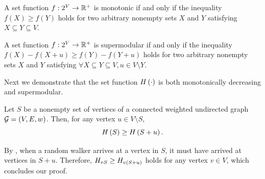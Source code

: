 \documentclass[10pt,twocolumn,twoside]{IEEEtran}
\begin{document}
\begin{definition}[Monotonicity]
    A set function \(f:2^{V}\to\mathbb{R}^+\) is monotonic if and only if the inequality \(f(X)\ge f(Y)\) holds for two arbitrary  nonempty sets \(X\) and \(Y\)  satisfying \(X\subseteq Y\subseteq V\).
\end{definition}

\begin{definition}[Supermodularity]
    A set function \(f:2^{V}\to\mathbb{R}^+\) is  supermodular if and only if the inequality \(f(X)-f(X+u)\ge f(Y)-f(Y+u)\) holds for two arbitrary nonempty sets \(X\) and \(Y\) satisfying \(\forall X\subseteq Y\subseteq V, u\in V\setminus Y\).
\end{definition}

Next we demonstrate that the set function \(H\left(\cdot\right)\) is both monotonically decreasing and supermodular.

\begin{theorem}\label{thm:mono}
    Let \(S\) be a nonempty set of vertiecs of a connected weighted undirected graph \(\mathcal{G}=(V,E,w)\). Then, for any vertex \(u\in V\setminus S\),
    \begin{equation*}
        H\left(S\right)\ge H\left(S+u\right).
    \end{equation*}
\end{theorem}
\begin{IEEEproof}
    By , when a random walker arrives at a vertex in \(S\), it must have arrived at vertices in \(S+u\). Therefore, \(H_{vS}\ge H_{v\left( S+u \right)}\) holds for any vertex \(v\in V\), which concludes our proof.
\end{IEEEproof}
\end{document}
